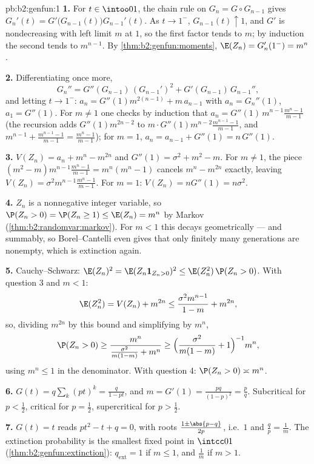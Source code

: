 \begin{solution}{pb:b2:genfun:1}
\textbf{1.} For $t \in \intoo01$, the chain rule on $G_n = G
\circ G_{n-1}$ gives $G_n'(t) =
G'\bigl(G_{n-1}(t)\bigr)G_{n-1}'(t)$. As $t \to 1^-$,
$G_{n-1}(t) \uparrow 1$, and $G'$ is nondecreasing with
left limit $m$ at $1$, so the first factor tends to $m$; by
induction the second tends to $m^{n-1}$. By
\cref{thm:b2:genfun:moments}, $\E(Z_n) = G_n'(1^-) = m^n$.

\textbf{2.} Differentiating once more,
\[
G_n'' = G''(G_{n-1})\,(G_{n-1}')^2 +
G'(G_{n-1})\,G_{n-1}'',
\]
and letting $t \to 1^-$: $a_n = G''(1)m^{2(n-1)} + m\,
a_{n-1}$ with $a_n = G_n''(1)$, $a_1 = G''(1)$. For $m \neq
1$ one checks by induction that $a_n = G''(1)\,m^{n-1}
\frac{m^n - 1}{m - 1}$ (the recursion adds $G''(1)m^{2n-2}$
to $m\cdot G''(1)m^{n-2}\frac{m^{n-1}-1}{m-1}$, and
$m^{n-1} + \frac{m^{n-1}-1}{m-1} = \frac{m^n - 1}{m-1}$);
for $m = 1$, $a_n = a_{n-1} + G''(1) = n\,G''(1)$.

\textbf{3.} $V(Z_n) = a_n + m^n - m^{2n}$ and $G''(1) =
\sigma^2 + m^2 - m$. For $m \neq 1$, the piece $(m^2 -
m)m^{n-1}\frac{m^n-1}{m-1} = m^n(m^n - 1)$ cancels $m^n -
m^{2n}$ exactly, leaving $V(Z_n) =
\sigma^2m^{n-1}\frac{m^n-1}{m-1}$. For $m = 1$: $V(Z_n) =
nG''(1) = n\sigma^2$.

\textbf{4.} $Z_n$ is a nonnegative integer variable, so
$\P(Z_n > 0) = \P(Z_n \geq 1) \leq \E(Z_n) = m^n$ by Markov
(\cref{thm:b2:randomvar:markov}). For $m < 1$ this decays
geometrically --- and summably, so Borel--Cantelli even gives
that only finitely many generations are nonempty, which is
extinction again.

\textbf{5.} Cauchy--Schwarz: $\E(Z_n)^2 = \E(Z_n\mathbf
1_{Z_n>0})^2 \leq \E(Z_n^2)\,\P(Z_n > 0)$. With question 3
and $m < 1$:
\[
\E(Z_n^2) = V(Z_n) + m^{2n}
\leq \frac{\sigma^2m^{n-1}}{1-m} + m^{2n},
\]
so, dividing $m^{2n}$ by this bound and simplifying by
$m^n$,
\[
\P(Z_n > 0) \geq \frac{m^n}{\frac{\sigma^2}{m(1-m)} + m^n}
\geq \Bigl(\frac{\sigma^2}{m(1-m)} + 1\Bigr)^{-1}m^n ,
\]
using $m^n \leq 1$ in the denominator. With question 4:
$\P(Z_n > 0) \asymp m^n$.

\textbf{6.} $G(t) = q\sum_k(pt)^k = \frac{q}{1 - pt}$, and $m
= G'(1) = \frac{pq}{(1-p)^2} = \frac pq$. Subcritical for $p
< \frac12$, critical for $p = \frac12$, supercritical for $p
> \frac12$.

\textbf{7.} $G(t) = t$ reads $pt^2 - t + q = 0$, with roots
$\frac{1 \pm \abs{p - q}}{2p}$, i.e.\ $1$ and $\frac qp =
\frac1m$. The extinction probability is the smallest fixed
point in $\intcc01$ (\cref{thm:b2:genfun:extinction}):
$q_{\mathrm{ext}} = 1$ if $m \leq 1$, and $\frac1m$ if $m >
1$.


\end{solution}

